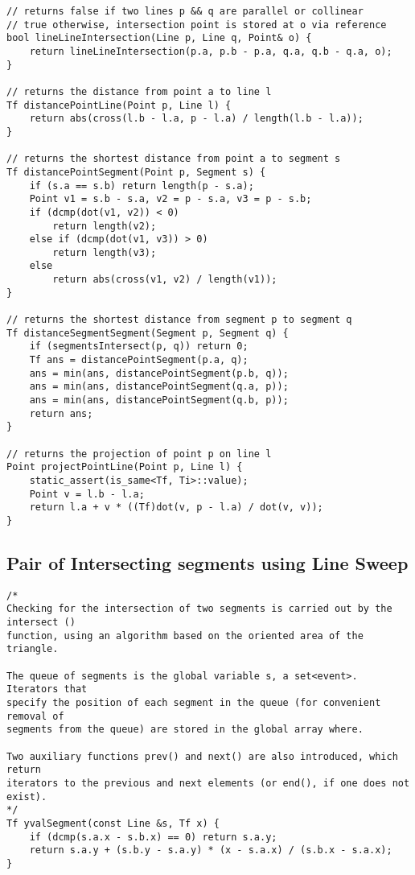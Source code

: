 \documentclass[10pt,a4paper,onesided]{article}
\begin{document}
\begin{multicols*}{3}
\begin{lstlisting}
// returns false if two lines p && q are parallel or collinear
// true otherwise, intersection point is stored at o via reference
bool lineLineIntersection(Line p, Line q, Point& o) {
    return lineLineIntersection(p.a, p.b - p.a, q.a, q.b - q.a, o);
}

// returns the distance from point a to line l
Tf distancePointLine(Point p, Line l) {
    return abs(cross(l.b - l.a, p - l.a) / length(l.b - l.a));
}

// returns the shortest distance from point a to segment s
Tf distancePointSegment(Point p, Segment s) {
    if (s.a == s.b) return length(p - s.a);
    Point v1 = s.b - s.a, v2 = p - s.a, v3 = p - s.b;
    if (dcmp(dot(v1, v2)) < 0)
        return length(v2);
    else if (dcmp(dot(v1, v3)) > 0)
        return length(v3);
    else
        return abs(cross(v1, v2) / length(v1));
}

// returns the shortest distance from segment p to segment q
Tf distanceSegmentSegment(Segment p, Segment q) {
    if (segmentsIntersect(p, q)) return 0;
    Tf ans = distancePointSegment(p.a, q);
    ans = min(ans, distancePointSegment(p.b, q));
    ans = min(ans, distancePointSegment(q.a, p));
    ans = min(ans, distancePointSegment(q.b, p));
    return ans;
}

// returns the projection of point p on line l
Point projectPointLine(Point p, Line l) {
    static_assert(is_same<Tf, Ti>::value);
    Point v = l.b - l.a;
    return l.a + v * ((Tf)dot(v, p - l.a) / dot(v, v));
}
\end{lstlisting}
\subsection{Pair of Intersecting segments using Line Sweep}
\begin{lstlisting}
/*
Checking for the intersection of two segments is carried out by the intersect ()
function, using an algorithm based on the oriented area of the triangle.

The queue of segments is the global variable s, a set<event>. Iterators that
specify the position of each segment in the queue (for convenient removal of
segments from the queue) are stored in the global array where.

Two auxiliary functions prev() and next() are also introduced, which return
iterators to the previous and next elements (or end(), if one does not exist).
*/
Tf yvalSegment(const Line &s, Tf x) {
    if (dcmp(s.a.x - s.b.x) == 0) return s.a.y;
    return s.a.y + (s.b.y - s.a.y) * (x - s.a.x) / (s.b.x - s.a.x);
}


\end{lstlisting}
\end{multicols*}
\end{document}
